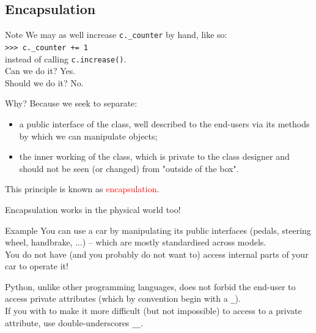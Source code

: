 \documentclass[t,handout,9pt]{beamer}
\begin{document}
\subsection{Encapsulation}
\begin{frame}
\vfill
\begin{block}{Note}
We may as well increase \texttt{c.\_counter} by hand, like so:\\
\texttt{>{}>{}> c.\_counter += 1}\\
instead of calling \texttt{c.increase()}.\\
\vspace{2mm}
Can we do it? Yes.\\
Should we do it? No.
\end{block}
\vfill
Why? Because we seek to separate:
\begin{itemize}
	\item a public interface of the class, well described to the end-users via its methods by which we can manipulate objects;
	\item the inner working of the class, which is private to the class designer and should not be seen (or changed) from "outside of the box".
\end{itemize}
\vfill
This principle is known as \textcolor{red}{encapsulation}.
\vfill
\end{frame}
%
\begin{frame}
\vfill
Encapsulation works in the physical world too!
\begin{block}{Example}
You can use a car by manipulating its public interfaces (pedals, steering wheel, handbrake, ...) -- which are mostly standardised across models.\\
\vspace{2mm}
You do not have (and you probably do not want to) access internal parts of your car to operate it!
\end{block}
\vfill
Python, unlike other programming languages, does not forbid the end-user to access private attributes (which by convention begin with a \texttt{\_}).\\
\vfill
If you with to make it more difficult (but not impossible) to access to a private attribute, use double-underscores \texttt{\_\_}.
\vfill
\end{frame}
\end{document}
